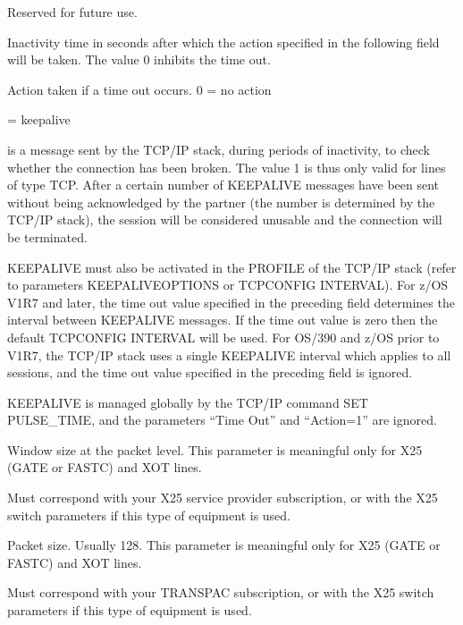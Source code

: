 \documentclass[letterpaper,10pt,english]{sphinxmanual}
\begin{document}
\begin{description}
\begin{description}
\end{description}

\sphinxAtStartPar
Reserved for future use.

\sphinxAtStartPar
Inactivity time in seconds after which the action specified in the
following field will be taken. The value 0 inhibits the time out.

\sphinxAtStartPar
Action taken if a time out occurs. 0 = no action

 = keepalive

\sphinxAtStartPar
is a message sent by the TCP/IP stack, during periods of inactivity,
to check whether the connection has been broken. The value 1 is thus
only valid for lines of type TCP. After a certain number of
KEEPALIVE messages have been sent without being acknowledged by the
partner (the number is determined by the TCP/IP stack), the session
will be considered unusable and the connection will be terminated.

\sphinxAtStartPar
KEEPALIVE must also be activated in the PROFILE of the TCP/IP stack
(refer to parameters KEEPALIVEOPTIONS or TCPCONFIG INTERVAL). For
z/OS V1R7 and later, the time out value specified in the preceding
field determines the interval between KEEPALIVE messages. If the
time out value is zero then the default TCPCONFIG INTERVAL will be
used. For OS/390 and z/OS prior to V1R7, the TCP/IP stack uses a
single KEEPALIVE interval which applies to all sessions, and the
time out value specified in the preceding field is ignored.

\sphinxAtStartPar
KEEPALIVE is managed globally by the TCP/IP command SET PULSE\_TIME,
and the parameters “Time Out” and “Action=1” are ignored.

\sphinxAtStartPar
Window size at the packet level. This parameter is meaningful only
for X25 (GATE or FASTC) and XOT lines.

\sphinxAtStartPar
Must correspond with your X25 service provider subscription, or with
the X25 switch parameters if this type of equipment is used.

\sphinxAtStartPar
Packet size. Usually 128. This parameter is meaningful only for X25
(GATE or FASTC) and XOT lines.

\sphinxAtStartPar
Must correspond with your TRANSPAC subscription, or with the X25
switch parameters if this type of equipment is used.


\end{description}
\end{document}
